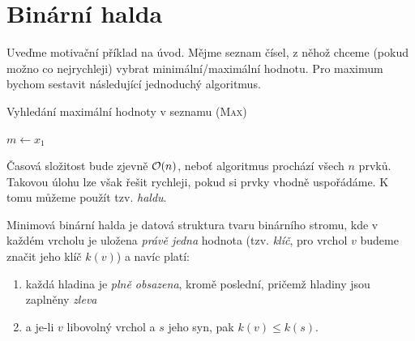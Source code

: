 \section{Binární halda}\label{sec:halda}
Uveďme motivační příklad na úvod. Mějme seznam čísel, z něhož chceme (pokud možno co nejrychleji) vybrat minimální/maximální hodnotu. Pro maximum bychom sestavit následující jednoduchý algoritmus.
\begin{algorithm}\label{alg:max}
    \caption{Vyhledání maximální hodnoty v seznamu (\textsc{Max})}
    $m\gets x_1$\\
\end{algorithm}

Časová složitost bude zjevně $\mathcal{O}(n)$, neboť algoritmus prochází všech $n$ prvků. Takovou úlohu lze však řešit rychleji, pokud si prvky vhodně uspořádáme. K tomu můžeme použít tzv. \emph{haldu}. 
\begin{definition}\label{def:binarni_halda}
    Minimová binární halda je datová struktura tvaru binárního stromu, kde v každém vrcholu je uložena \emph{právě jedna} hodnota (tzv. \emph{klíč}, pro vrchol $v$ budeme značit jeho klíč $k(v)$) a navíc platí:
    \begin{enumerate}[label=(\roman*)]
        \item\label{binhalda_podminka_1} každá hladina je \emph{plně obsazena}, kromě poslední, pričemž hladiny jsou zaplněny \emph{zleva}
        \item\label{binhalda_podminka_2} a je-li $v$ libovolný vrchol a $s$ jeho syn, pak $k(v)\leqslant k(s)$.
    \end{enumerate}
\end{definition}

